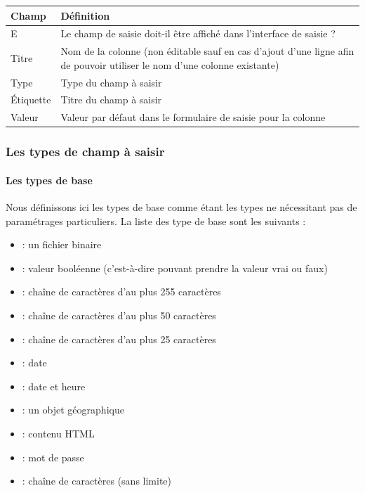 \documentclass[letterpaper,10pt,english]{sphinxmanual}
\begin{document}
\begin{tabulary}{\linewidth}{|L|L|}
\hline

\textbf{Champ}
 & 
\textbf{Définition}
\\
\hline
E
 & 
Le champ de saisie doit-il être affiché dans l'interface de saisie ?
\\
\hline
Titre
 & 
Nom de la colonne (non éditable sauf en cas d'ajout d'une ligne afin de pouvoir utiliser le nom d'une colonne existante)
\\
\hline
Type
 & 
Type du champ à saisir
\\
\hline
Étiquette
 & 
Titre du champ à saisir
\\
\hline
Valeur
 & 
Valeur par défaut dans le formulaire de saisie pour la colonne
\\
\hline\end{tabulary}



\subsubsection{Les types de champ à saisir}
\label{tables/infopanel:les-types-de-champ-a-saisir}

\paragraph{Les types de base}
\label{tables/infopanel:les-types-de-base}
Nous définissons ici les types de base comme étant les types ne
nécessitant pas de paramétrages particuliers. La liste des type de
base sont les suivants :
\begin{itemize}
\item {} 
 : un fichier binaire

\item {} 
 : valeur booléenne (c'est-à-dire pouvant prendre la
valeur vrai ou faux)

\item {} 
 : chaîne de caractères d'au plus 255
caractères

\item {} 
 : chaîne de caractères d'au plus 50
caractères

\item {} 
 : chaîne de caractères d'au plus 25
caractères

\item {} 
 : date

\item {} 
 : date et heure

\item {} 
 : un objet géographique

\item {} 
 : contenu HTML

\item {} 
 : mot de passe

\item {} 
 : chaîne de caractères (sans limite)

\end{itemize}
\end{document}
